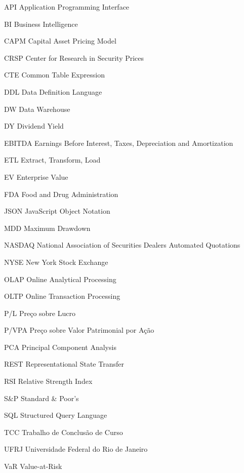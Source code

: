 \begin{siglas}
\item [API] Application Programming Interface
\item [BI] Business Intelligence
\item [CAPM] Capital Asset Pricing Model
\item [CRSP] Center for Research in Security Prices
\item [CTE] Common Table Expression
\item [DDL] Data Definition Language
\item [DW] Data Warehouse
\item [DY] Dividend Yield
\item [EBITDA] Earnings Before Interest, Taxes, Depreciation and Amortization
\item [ETL] Extract, Transform, Load
\item [EV] Enterprise Value
\item [FDA] Food and Drug Administration
\item [JSON] JavaScript Object Notation
\item [MDD] Maximum Drawdown
\item [NASDAQ] National Association of Securities Dealers Automated Quotations
\item [NYSE] New York Stock Exchange
\item [OLAP] Online Analytical Processing
\item [OLTP] Online Transaction Processing
\item [P/L] Preço sobre Lucro
\item [P/VPA] Preço sobre Valor Patrimonial por Ação
\item [PCA] Principal Component Analysis
\item [REST] Representational State Transfer
\item [RSI] Relative Strength Index
\item [S\&P] Standard \& Poor's
\item [SQL] Structured Query Language
\item [TCC] Trabalho de Conclusão de Curso
\item [UFRJ] Universidade Federal do Rio de Janeiro
\item [VaR] Value-at-Risk
\end{siglas}